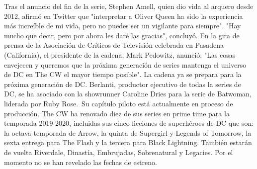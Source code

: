 \documentclass{article}%
\begin{document}
%
Tras el anuncio del fin de la serie, Stephen Amell, quien dio vida al arquero desde 2012, afirmó en Twitter que "interpretar a Oliver Queen ha sido la experiencia más increíble de mi vida, pero no puedes ser un vigilante para siempre".%
\newline%
%
"Hay mucho que decir, pero por ahora les daré las gracias", concluyó.%
\newline%
%
En la gira de prensa de la Asociación de Críticos de Televisión celebrada en Pasadena (California), el presidente de la cadena, Mark Pedowitz, anunció: "Las cosas envejecen y queremos que la próxima generación de series mantenga el universo de DC en The CW el mayor tiempo posible".%
\newline%
%
La cadena ya se prepara para la próxima generación de DC. Berlanti, productor ejecutivo de todas la series de DC, se ha asociado con la showrunner Caroline Dries para la serie de Batwoman, liderada por Ruby Rose.~Su capítulo piloto está actualmente en proceso de producción.%
\newline%
%
The CW ha renovado diez de sus series en prime time para la temporada 2019{-}2020, incluidas sus cinco ficciones de superhéroes de DC que son: la octava temporada de Arrow, la quinta de Supergirl y Legends of Tomorrow, la sexta entrega para The Flash y la tercera para Black Lightning.%
\newline%
%
También estarán de vuelta Riverdale, Dinastía, Embrujadas, Sobrenatural y Legacies. Por el momento no se han revelado las fechas de estreno.%
\newline%
%
\end{document}
